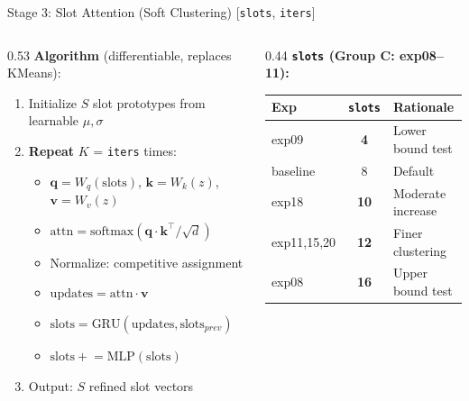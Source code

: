 \documentclass[aspectratio=169, 10pt]{beamer}
\newcommand{\param}[1]{\textcolor{paramred}{\texttt{#1}}}
\begin{document}
\begin{frame}{Stage 3: Slot Attention (Soft Clustering) \quad\small[\param{slots}, \param{iters}]}

\begin{columns}[T]
\begin{column}{0.53\textwidth}
\textbf{Algorithm} (differentiable, replaces KMeans):
\begin{enumerate}
    \item Initialize $S$ slot prototypes from learnable $\mu, \sigma$
    \item \textbf{Repeat} $K$ = \param{iters} times:
    \begin{itemize}
        \item $\mathbf{q} = W_q(\text{slots})$, \; $\mathbf{k} = W_k(z)$, \; $\mathbf{v} = W_v(z)$
        \item $\text{attn} = \text{softmax}(\mathbf{q} \cdot \mathbf{k}^\top / \sqrt{d})$
        \item Normalize: competitive assignment
        \item $\text{updates} = \text{attn} \cdot \mathbf{v}$
        \item $\text{slots} = \text{GRU}(\text{updates}, \text{slots}_{prev})$
        \item $\text{slots} \mathrel{+}= \text{MLP}(\text{slots})$
    \end{itemize}
    \item Output: $S$ refined slot vectors
\end{enumerate}
\end{column}
\begin{column}{0.44\textwidth}
\textbf{\param{slots} (Group C: exp08--11):}
\begin{center}
\small
\begin{tabular}{lcl}
\toprule
Exp & \param{slots} & Rationale \\
\midrule
exp09 & \textbf{4} & Lower bound test \\
baseline & 8 & Default \\
exp18 & \textbf{10} & Moderate increase \\
exp11,15,20 & \textbf{12} & Finer clustering \\
exp08 & \textbf{16} & Upper bound test \\
\bottomrule
\end{tabular}
\end{center}


\end{column}
\end{columns}
\end{frame}
\end{document}
